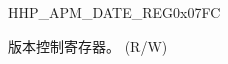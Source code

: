 \begin{register}{H}{HP\_APM\_DATE\_REG}{0x07FC}\label{regdesc:HPAPMDATEREG}
%
%
\regnewline%
\begin{regdesc}\begin{reglist}
\label{fielddesc:HPAPMDATE}\item [HP\_APM\_DATE] 版本控制寄存器。 (R/W)
\end{reglist}\end{regdesc}
\end{register}



